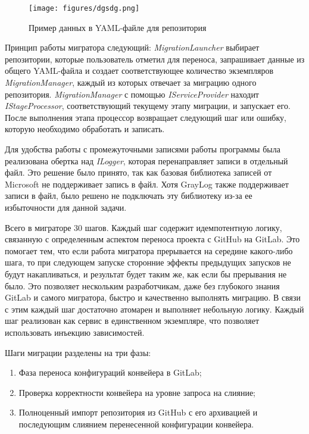 \begin{figure}[H]
  \centering
  \texttt{[image: figures/dgsdg.png]}
  \caption{Пример данных в YAML-файле для репозитория}
  \label{3}
\end{figure}

Принцип работы мигратора следующий: \emph{MigrationLauncher} выбирает репозитории, которые пользователь отметил для переноса, запрашивает данные из общего YAML-файла и создает соответствующее количество экземпляров \emph{MigrationManager}, каждый из которых отвечает за миграцию одного репозитория. \emph{MigrationManager} с помощью \emph{IServiceProvider} находит \emph{IStageProcessor}, соответствующий текущему этапу миграции, и запускает его. После выполнения этапа процессор возвращает следующий шаг или ошибку, которую необходимо обработать и записать.

Для удобства работы с промежуточными записями работы программы была реализована обертка над \emph{ILogger}, которая перенаправляет записи в отдельный файл. Это решение было принято, так как базовая библиотека записей от Microsoft не поддерживает запись в файл. Хотя GrayLog \cite{graylog} также поддерживает записи в файл, было решено не подключать эту библиотеку из-за ее избыточности для данной задачи.

Всего в миграторе 30 шагов. Каждый шаг содержит идемпотентную логику, связанную с определенным аспектом переноса проекта с GitHub на GitLab. Это помогает тем, что если работа мигратора прерывается на середине какого-либо шага, то при следующем запуске сторонние эффекты предыдущих запусков не будут накапливаться, и результат будет таким же, как если бы прерывания не было. Это позволяет нескольким разработчикам, даже без глубокого знания GitLab и самого мигратора, быстро и качественно выполнять миграцию. В связи с этим каждый шаг достаточно атомарен и выполняет небольную логику. Каждый шаг реализован как сервис в единственном экземпляре, что позволяет использовать инъекцию зависимостей.

Шаги миграции разделены на три фазы:
\begin{enumerate}
  \item Фаза переноса конфигураций конвейера в GitLab;
  \item Проверка корректности конвейера на уровне запроса на слияние;
  \item Полноценный импорт репозитория из GitHub с его архивацией и последующим слиянием перенесенной конфигурации конвейера.
\end{enumerate}

